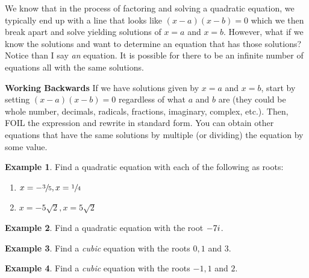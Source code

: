 \documentclass[addpoints,12pt]{exam}
\theoremstyle{definition}
\newcommand{\iu}{{i\mkern1mu}}
\theoremstyle{break}
\theoremstyle{break}
\newtheorem{example}{Example}[subsection]
\begin{document}
We know that in the process of factoring and solving a quadratic equation, we typically end up with a line that looks like $(x-a)(x-b)=0$ which we then break apart and solve yielding solutions of $x=a$ and $x=b$. However, what if we know the solutions and want to determine an equation that has those solutions? Notice than I say \emph{an} equation. It is possible for there to be an infinite number of equations all with the same solutions.

\vspace{.2in}

\begin{mdframed}
\textbf{Working Backwards}
If we have solutions given by $x=a$ and $x=b$, start by setting $(x-a)(x-b)=0$ regardless of what $a$ and $b$ are (they could be whole number, decimals, radicals, fractions, imaginary, complex, etc.). Then, FOIL the expression and rewrite in standard form. You can obtain other equations that have the same solutions by multiple (or dividing) the equation by some value.
\end{mdframed}

\vspace{.2in}

\begin{example}
Find a quadratic equation with each of the following as roots:
\begin{enumerate}
\item $x = -\sfrac{3}{5}, x=\sfrac{1}{4}$
\vspace{2in}
\item $x = -5\sqrt{2}, x=5\sqrt{2}$
\end{enumerate}
\end{example}

\newpage

\begin{example}
Find a quadratic equation with the root $-7\iu$.
\vspace{2in}
\end{example}

\begin{example}
Find a \emph{cubic} equation with the roots $0, 1$ and $3$.
\vspace{2in}
\end{example}

\begin{example}
Find a \emph{cubic} equation with the roots $-1,1$ and $2$.
\end{example}
\end{document}
